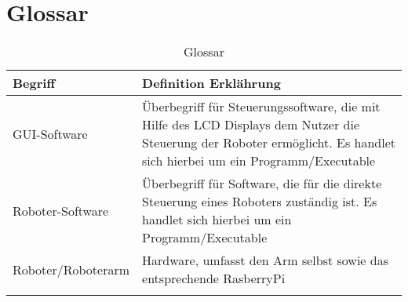 
\chapter{Glossar}

\begin{table}[h!]
	\centering
	\begin{tabular}{p{4cm}|p{10cm}|}
		\hline
		\textbf{Begriff} & \textbf{Definition Erklährung} \\
		\hline
		GUI-Software & 
            Überbegriff für Steuerungssoftware, die mit Hilfe des LCD Displays dem Nutzer die Steuerung der Roboter ermöglicht.
            Es handlet sich hierbei um ein Programm/Executable \\
		\hline
            Roboter-Software & 
            Überbegriff für Software, die für die direkte Steuerung eines Roboters zuständig ist.
            Es handlet sich hierbei um ein Programm/Executable \\
		\hline
            Roboter/Roboterarm &
            Hardware, umfasst den Arm selbst sowie das entsprechende RasberryPi \\
		& \\
		\hline
	\end{tabular}
	\caption{Glossar}
	\label{tab:glossar}
\end{table}